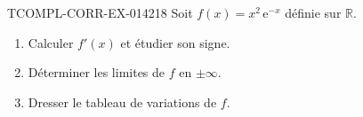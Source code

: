\begin{exercice}{TCOMPL-CORR-EX-014}{2}{18}
Soit $f(x) = x^2\,\mathrm{e}^{-x}$ définie sur $\mathbb{R}$.
\begin{enumerate}
  \item Calculer $f'(x)$ et étudier son signe.
  \item Déterminer les limites de $f$ en $\pm\infty$.
  \item Dresser le tableau de variations de $f$.
\end{enumerate}

\end{exercice}
